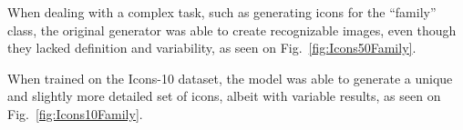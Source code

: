 When dealing with a complex task, such as generating icons for the ``family'' class, the original generator was able to create recognizable images, even though they lacked definition and variability, as seen on Fig.~\ref{fig:Icons50Family}.

When trained on the Icons-10 dataset, the model was able to generate a unique and slightly more detailed set of icons, albeit with variable results, as seen on Fig.~\ref{fig:Icons10Family}.
